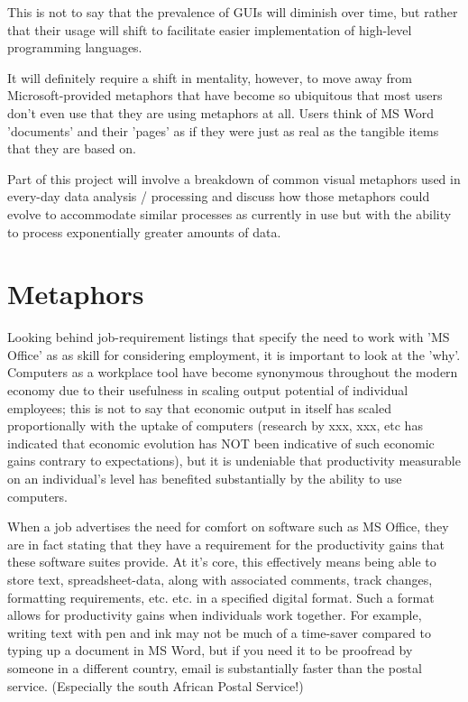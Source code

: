 This is not to say that the prevalence of GUIs will diminish over time, but rather that their usage will shift to facilitate easier implementation of high-level programming languages.

It will definitely require a shift in mentality, however, to move away from Microsoft-provided metaphors that have become so ubiquitous that most users don't even use that they are using metaphors at all. Users think of MS Word 'documents' and their 'pages' as if they were just as real as the tangible items that they are based on.

Part of this project will involve a breakdown of common visual metaphors used in every-day data analysis / processing and discuss how those metaphors could evolve to accommodate similar processes as currently in use but with the ability to process exponentially greater amounts of data.

\section{Metaphors}
Looking behind job-requirement listings that specify the need to work with 'MS Office' as as skill for considering employment, it is important to look at the 'why'. Computers as a workplace tool have become synonymous throughout the modern economy due to their usefulness in scaling output potential of individual employees; this is not to say that economic output in itself has scaled proportionally with the uptake of computers (research by xxx, xxx, etc has indicated that economic evolution has NOT been indicative of such economic gains contrary to expectations), but it is undeniable that productivity measurable on an individual's level has benefited substantially by the ability to use computers.

When a job advertises the need for comfort on software such as MS Office, they are in fact stating that they have a requirement for the productivity gains that these software suites provide. At it's core, this effectively means being able to store text, spreadsheet-data, along with associated comments, track changes, formatting requirements, etc. etc. in a specified digital format. Such a format allows for productivity gains when individuals work together. For example, writing text with pen and ink may not be much of a time-saver compared to typing up a document in MS Word, but if you need it to be proofread by someone in a different country, email is substantially faster than the postal service. (Especially the south African Postal Service!)

